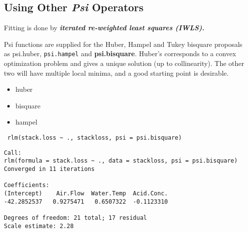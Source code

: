 \subsection{Using Other \textit{Psi} Operators}

Fitting is done by \textbf{\emph{iterated re-weighted least squares (IWLS).}}

Psi functions are supplied for the Huber, Hampel and Tukey bisquare proposals as psi.huber, \texttt{psi.hampel} and \textbf{psi.bisquare}. Huber's corresponds to a convex optimization problem and gives a unique solution (up to collinearity). The other two will have multiple local minima, and a good starting point is desirable.



\begin{itemize}
\item huber
\item bisquare
\item hampel

\end{itemize}

\begin{framed}
\begin{verbatim}
 rlm(stack.loss ~ ., stackloss, psi = psi.bisquare)
\end{verbatim}
\end{framed}
\begin{verbatim}
Call:
rlm(formula = stack.loss ~ ., data = stackloss, psi = psi.bisquare)
Converged in 11 iterations

Coefficients:
(Intercept)    Air.Flow  Water.Temp  Acid.Conc. 
-42.2852537   0.9275471   0.6507322  -0.1123310 

Degrees of freedom: 21 total; 17 residual
Scale estimate: 2.28 
\end{verbatim}


